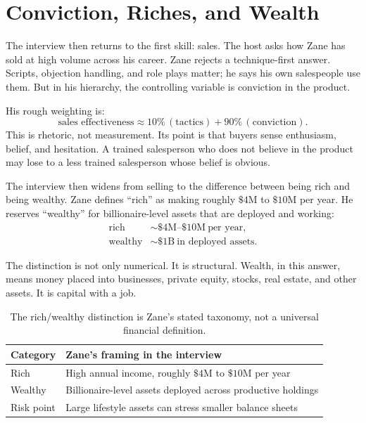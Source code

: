 \section{Conviction, Riches, and Wealth}

The interview then returns to the first skill: sales. The host asks how Zane has sold at high volume across his career. Zane rejects a technique-first answer. Scripts, objection handling, and role plays matter; he says his own salespeople use them. But in his hierarchy, the controlling variable is conviction in the product.

His rough weighting is:
\begin{equation}
\text{sales effectiveness}
\approx
10\%\,(\text{tactics})+90\%\,(\text{conviction}).
\end{equation}
This is rhetoric, not measurement. Its point is that buyers sense enthusiasm, belief, and hesitation. A trained salesperson who does not believe in the product may lose to a less trained salesperson whose belief is obvious.

The interview then widens from selling to the difference between being rich and being wealthy. Zane defines ``rich'' as making roughly \(\$4\mathrm{M}\) to \(\$10\mathrm{M}\) per year. He reserves ``wealthy'' for billionaire-level assets that are deployed and working:
\begin{align}
\text{rich} &\sim \$4\mathrm{M}\text{--}\$10\mathrm{M}\ \text{per year},\\
\text{wealthy} &\sim \$1\mathrm{B}\ \text{in deployed assets}.
\end{align}

The distinction is not only numerical. It is structural. Wealth, in this answer, means money placed into businesses, private equity, stocks, real estate, and other assets. It is capital with a job.

\begin{table}
\centering
\begin{tabular}{p{.30\linewidth}p{.56\linewidth}}
\hline
Category & Zane's framing in the interview\\
\hline
Rich & High annual income, roughly \(\$4\mathrm{M}\) to \(\$10\mathrm{M}\) per year\\
Wealthy & Billionaire-level assets deployed across productive holdings\\
Risk point & Large lifestyle assets can stress smaller balance sheets\\
\hline
\end{tabular}
\caption{The rich/wealthy distinction is Zane's stated taxonomy, not a universal financial definition.}
\end{table}

